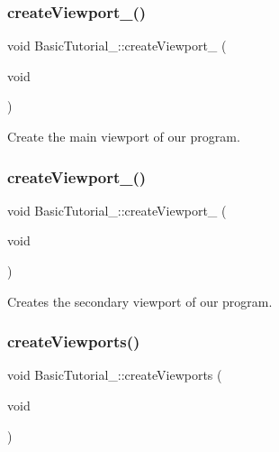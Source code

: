 \subsubsection{\texorpdfstring{create\+Viewport\+\_()}{createViewport\_00()}}
{\footnotesize\ttfamily void Basic\+Tutorial\+\_\+::create\+Viewport\+\_ (\begin{DoxyParamCaption}\item[{void}]{ }\end{DoxyParamCaption})\hspace{0.3cm}{\ttfamily [protected]}}



Create the main viewport of our program. 



 \mbox{\label{class_basic_tutorial__00_a2801a2f0d91d80b471da48344d2ccccf}} 
\subsubsection{\texorpdfstring{create\+Viewport\+\_()}{createViewport\_01()}}
{\footnotesize\ttfamily void Basic\+Tutorial\+\_\+::create\+Viewport\+\_ (\begin{DoxyParamCaption}\item[{void}]{ }\end{DoxyParamCaption})\hspace{0.3cm}{\ttfamily [protected]}}



Creates the secondary viewport of our program. 



 \mbox{\label{class_basic_tutorial__00_adc2454d9f8226e0958ecf702f355846e}} 
\subsubsection{\texorpdfstring{create\+Viewports()}{createViewports()}}
{\footnotesize\ttfamily void Basic\+Tutorial\+\_\+::create\+Viewports (\begin{DoxyParamCaption}\item[{void}]{ }\end{DoxyParamCaption})\hspace{0.3cm}{\ttfamily [virtual]}}



